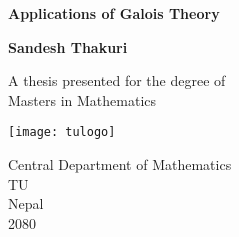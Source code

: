 \begin{titlepage}
    \begin{center}
        \vspace*{1cm}

        \Huge
        \textbf{Applications of Galois Theory}

        \vspace{0.5cm}

        \vspace{1.5cm}

        \textbf{Sandesh Thakuri}

         \vfill

        A thesis presented for the degree of\\
       Masters in Mathematics

        \vspace{0.8cm}

        \texttt{[image: tulogo]}

        \Large
        Central Department of Mathematics\\
        TU\\
        Nepal\\
        2080

    \end{center}
\end{titlepage}
